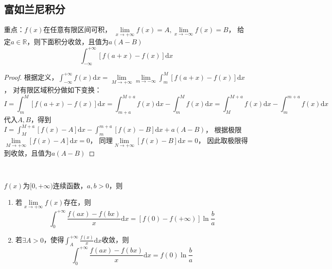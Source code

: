 \subsection{富如兰尼积分}

\begin{theorem}[两侧极限存在则无穷积分收敛]
  重点：$f(x)$在任意有限区间可积，
  $\lim \limits _{x \rightarrow +\infty}f(x) = A, \lim \limits _{x \rightarrow -\infty}f(x) = B$，
  给定$a \in \mathbb{R}$，则下面积分收敛，且值为$a(A - B)$
  \begin{equation*}
    \int_{-\infty}^{+\infty}[f(a+x) - f(x)]\mathrm{d} x
  \end{equation*}
\end{theorem}

\begin{proof}
  根据定义，$\int_{-\infty}^{+\infty}f(x)\mathrm{d} x = \lim \limits _{M \rightarrow +\infty}\lim \limits _{m \rightarrow -\infty} \int _m^M [f(a+x) - f(x)]\mathrm{d} x$，
  对有限区域积分做如下变换：
  \begin{equation*}
    I = \int_m^M [f(a+x) - f(x)]\mathrm{d} x = \int_{m+a}^{M+a}f(x)\mathrm{d}x - \int_m^M f(x)\mathrm{d} x = \int_M^{M+a}f(x)\mathrm{d} x - \int_m^{m+a}f(x)\mathrm{d}x
  \end{equation*}
  代入$A,B$，得到$I = \int_M^{M+a}[f(x) - A]\mathrm{d}x - \int _m^{m+a}[f(x) - B]\mathrm{d} x + a(A-B)$，
  根据极限$\lim \limits _{M \rightarrow +\infty} [f(x) - A]\mathrm{d} x = 0$，
  同理$\lim \limits _{N \rightarrow +\infty}[f(x) - B]\mathrm{d} x = 0$，
  因此取极限得到收敛，且值为$a(A - B)$
\end{proof}

~

\begin{theorem}[富如兰尼积分]
  $f(x)$为$[0,+\infty)$连续函数，$a,b>0$，则
  \begin{enumerate}
  \item 若$\lim \limits _{x \rightarrow +\infty}f(x)$存在，则
    \begin{equation*}
      \int_0^{+\infty} \frac{f(ax) - f(bx)}{x} \mathrm{d} x = [f(0) - f(+\infty)] \ln \frac{b}{a}
    \end{equation*}
  \item 若$\exists A > 0$，使得$\int_A^{+\infty} \frac{f(x)}{x}\mathrm{d} x$收敛，则
    \begin{equation*}
      \int_0^{+\infty} \frac{f(ax) - f(bx)}{x}\mathrm{d} x = f(0) \ln \frac{b}{a}
    \end{equation*}
  \end{enumerate}
\end{theorem}

